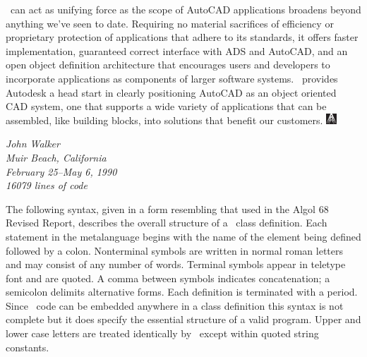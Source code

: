 \documentclass{article}
\begin{document}
\cw\ can act as unifying force as the scope of AutoCAD applications
broadens beyond anything we've seen to date.  Requiring no
material sacrifices of efficiency or proprietary protection of
applications that adhere to its standards, it offers faster
implementation, guaranteed correct interface with ADS and AutoCAD,
and an open object definition architecture that encourages users and
developers to incorporate applications as components of
larger software systems.  \cw\ provides Autodesk a head start in
clearly positioning AutoCAD as an object oriented CAD system, one that
supports a wide variety of applications that can be assembled,
like building blocks, into solutions that benefit our customers.
\includegraphics[width=11pt]{ailogo.eps}

{
\raggedleft \em
John Walker\\
Muir Beach, California\\
February 25--May 6, 1990\\
16079 lines of code\\
}

\onecolumn


The following syntax, given in a form resembling that used in the
Algol 68 Revised Report, describes the overall structure of a \cw\
class definition.  Each statement in the metalanguage begins
with the name of the element being defined followed by a colon.  Nonterminal
symbols are written in normal roman letters and may consist of any
number of words.  Terminal symbols appear in teletype font and are
quoted.  A comma between symbols indicates concatenation; a semicolon
delimits alternative forms.  Each definition is terminated with a
period.  Since \atlas\ code can be embedded anywhere in a class
definition this syntax is not complete but it does specify the
essential structure of a valid program.  Upper and lower case letters
are treated identically by \cw\ except within quoted string constants.

\newcommand{\sy}[1]{``{\tt #1}''}
\end{document}
